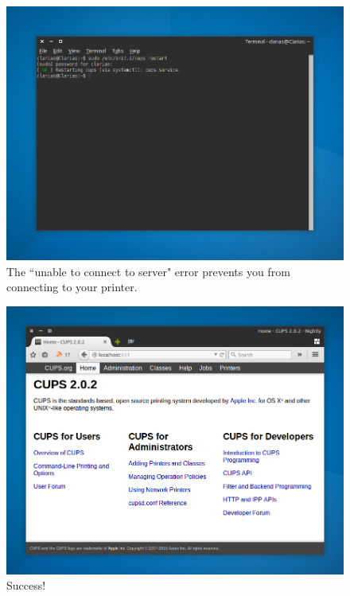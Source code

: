 \documentclass[12pt, a4paper]{article}
\begin{document}
\begin{figure}[!htp]
  \centering
  \includegraphics[width=1\textwidth]{imgs/unable-to-connect-to-server-5.png}
  \caption{The ``unable to connect to server" error prevents you from connecting to your printer.}
  \label{fig15}
\end{figure}




\begin{figure}[!htp]
  \centering
  \includegraphics[width=1\textwidth]{imgs/unable-to-connect-to-server-6.png}
  \caption{Success!}
  \label{fig16}
\end{figure}
\end{document}
